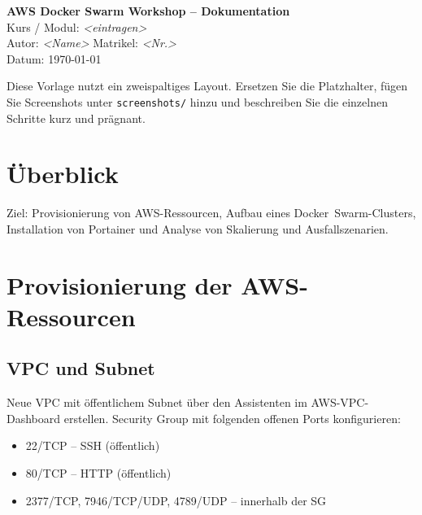 \documentclass[11pt,a4paper,twocolumn]{article}
\begin{document}
\clearpage
\restoregeometry
\twocolumn
\endgroup

\begin{titlepage}
  \centering
  {\LARGE \textbf{AWS Docker Swarm Workshop – Dokumentation}}\\[6mm]
  {\large Kurs / Modul: \textit{<eintragen>} }\\[2mm]
  {\large Autor: \textit{<Name>} \quad Matrikel: \textit{<Nr.>}}\\[2mm]
  {\large Datum: \today}\\[10mm]
  \vfill
  \begin{tcolorbox}[colback=gray!10,colframe=gray!50!black,title=Hinweis]
  Diese Vorlage nutzt ein zweispaltiges Layout. Ersetzen Sie die Platzhalter, fügen Sie
  Screenshots unter \texttt{screenshots/} hinzu und beschreiben Sie die einzelnen Schritte
  kurz und prägnant.
  \end{tcolorbox}
  \vfill
\end{titlepage}

\onecolumn
\tableofcontents
\newpage
\twocolumn

\section{Überblick}
Ziel: Provisionierung von AWS-Ressourcen, Aufbau eines Docker~Swarm-Clusters, Installation von Portainer und Analyse von Skalierung und Ausfallszenarien.

\section{Provisionierung der AWS-Ressourcen}
\subsection{VPC und Subnet}
Neue VPC mit öffentlichem Subnet über den Assistenten im AWS-VPC-Dashboard erstellen. Security Group mit folgenden offenen Ports konfigurieren:

\begin{itemize}[leftmargin=*]
  \item 22/TCP – SSH (öffentlich)
  \item 80/TCP – HTTP (öffentlich)
  \item 2377/TCP, 7946/TCP/UDP, 4789/UDP – innerhalb der SG
\end{itemize}
\end{document}
